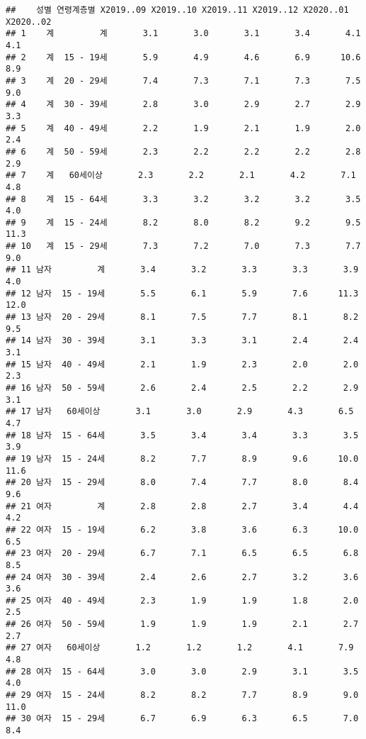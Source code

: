\documentclass[]{article}
\begin{document}
\begin{verbatim}
##    성별 연령계층별 X2019..09 X2019..10 X2019..11 X2019..12 X2020..01 X2020..02
## 1    계         계       3.1       3.0       3.1       3.4       4.1       4.1
## 2    계  15 - 19세       5.9       4.9       4.6       6.9      10.6       8.9
## 3    계  20 - 29세       7.4       7.3       7.1       7.3       7.5       9.0
## 4    계  30 - 39세       2.8       3.0       2.9       2.7       2.9       3.3
## 5    계  40 - 49세       2.2       1.9       2.1       1.9       2.0       2.4
## 6    계  50 - 59세       2.3       2.2       2.2       2.2       2.8       2.9
## 7    계   60세이상       2.3       2.2       2.1       4.2       7.1       4.8
## 8    계  15 - 64세       3.3       3.2       3.2       3.2       3.5       4.0
## 9    계  15 - 24세       8.2       8.0       8.2       9.2       9.5      11.3
## 10   계  15 - 29세       7.3       7.2       7.0       7.3       7.7       9.0
## 11 남자         계       3.4       3.2       3.3       3.3       3.9       4.0
## 12 남자  15 - 19세       5.5       6.1       5.9       7.6      11.3      12.0
## 13 남자  20 - 29세       8.1       7.5       7.7       8.1       8.2       9.5
## 14 남자  30 - 39세       3.1       3.3       3.1       2.4       2.4       3.1
## 15 남자  40 - 49세       2.1       1.9       2.3       2.0       2.0       2.3
## 16 남자  50 - 59세       2.6       2.4       2.5       2.2       2.9       3.1
## 17 남자   60세이상       3.1       3.0       2.9       4.3       6.5       4.7
## 18 남자  15 - 64세       3.5       3.4       3.4       3.3       3.5       3.9
## 19 남자  15 - 24세       8.2       7.7       8.9       9.6      10.0      11.6
## 20 남자  15 - 29세       8.0       7.4       7.7       8.0       8.4       9.6
## 21 여자         계       2.8       2.8       2.7       3.4       4.4       4.2
## 22 여자  15 - 19세       6.2       3.8       3.6       6.3      10.0       6.5
## 23 여자  20 - 29세       6.7       7.1       6.5       6.5       6.8       8.5
## 24 여자  30 - 39세       2.4       2.6       2.7       3.2       3.6       3.6
## 25 여자  40 - 49세       2.3       1.9       1.9       1.8       2.0       2.5
## 26 여자  50 - 59세       1.9       1.9       1.9       2.1       2.7       2.7
## 27 여자   60세이상       1.2       1.2       1.2       4.1       7.9       4.8
## 28 여자  15 - 64세       3.0       3.0       2.9       3.1       3.5       4.0
## 29 여자  15 - 24세       8.2       8.2       7.7       8.9       9.0      11.0
## 30 여자  15 - 29세       6.7       6.9       6.3       6.5       7.0       8.4
\end{verbatim}
\end{document}
